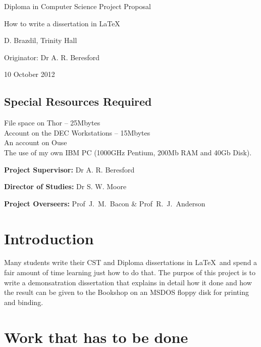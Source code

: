 



\vfil

\centerline{\Large Diploma in Computer Science Project Proposal}
\vspace{0.4in}
\centerline{\Large How to write a dissertation in \LaTeX\ }
\vspace{0.4in}
\centerline{\large D. Brazdil, Trinity Hall}
\vspace{0.3in}
\centerline{\large Originator: Dr A. R. Beresford}
\vspace{0.3in}
\centerline{\large 10 October 2012}

\vfil

\subsection*{Special Resources Required}
File space on Thor -- 25Mbytes\\
Account on the DEC Workstations -- 15Mbytes\\
An account on Ouse\\
The use of my own IBM PC (1000GHz Pentium, 200Mb RAM and 40Gb Disk).
\vspace{0.2in}

\noindent
{\bf Project Supervisor:} Dr A. R.	 Beresford
\vspace{0.2in}

\noindent
{\bf Director of Studies:} Dr S. W. Moore
\vspace{0.2in}
\noindent
 
\noindent
{\bf Project Overseers:} Prof~J.~M.~Bacon  \& Prof~R.~J.~Anderson

\vfil
\pagebreak


\section*{Introduction}

Many students write their CST and Diploma dissertations in \LaTeX\ and
spend a fair amount of time learning just how to do that. The purpos of 
this project is to write a demonsatration dissertation that explains in
detail how it done and how the result can be given to the Bookshop
on an MSDOS floppy disk for printing and binding.

\section*{Work that has to be done}

